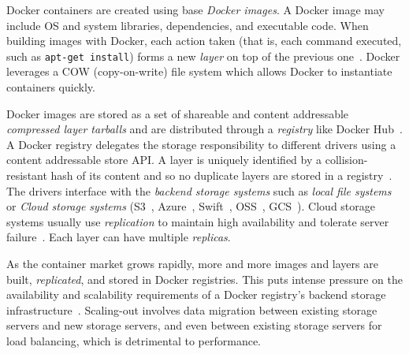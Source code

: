 %
%
%
Docker containers are created using base \emph{Docker images}.  A Docker image
may include OS and system libraries, dependencies, and executable code. 
%
When building images with Docker, each action taken (that is, each command
executed, such as \texttt{apt-get install}) forms a new \emph{layer} on top of
the previous one~\cite{docker}.
%
Docker leverages a COW (copy-on-write) file system which allows Docker to
instantiate containers quickly. 
%
%
%


%
%
Docker images are stored as a set of shareable and content addressable
\emph{compressed layer tarballs} and are distributed through a \emph{registry}
like Docker Hub~\cite{docker-hub}.
%
A Docker registry delegates the storage responsibility to different drivers
using a content addressable store API.
%
A layer is uniquely identified by a collision-resistant hash of its content and
so no duplicate layers are stored in a registry~\cite{docker-hub}.
%
The drivers interface with the \emph{backend storage systems} such as
\emph{local file systems} or \emph{Cloud storage systems} (\eg S3~\cite{s3},
Azure~\cite{azuredriver}, Swift~\cite{swift}, OSS~\cite{oss}, GCS~\cite{gcs}).
%
Cloud storage systems usually use \emph{replication} to maintain high availability and tolerate server failure~\cite{Bonvin:2010:SFS:1807128.1807162}.
%
Each layer can have multiple \emph{replicas}.


%
%
As the container market grows rapidly, more and more images and layers are
built, \emph{replicated}, and stored in Docker registries.
%
This puts intense pressure on the availability and scalability requirements of
a Docker registry's backend storage infrastructure~\cite{5655241}. 
%
Scaling-out involves data migration between existing storage servers and new
storage servers, and even between existing storage servers for load balancing,
which is detrimental to performance.

